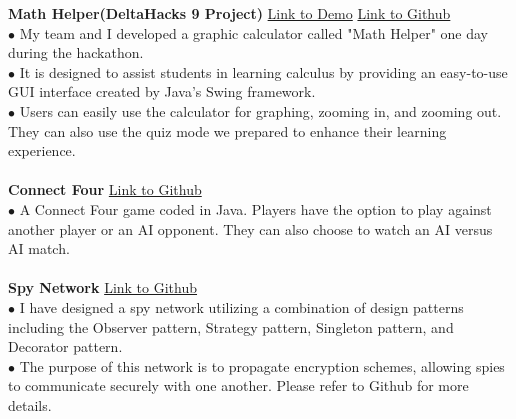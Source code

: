 \documentclass[letterpaper,12pt]{article}
\begin{document}
\textbf{Math Helper(DeltaHacks 9 Project)}  \hfill \href{https://devpost.com/software/math-helper-graphing-calculator}{Link to Demo} \hspace{0.2cm} \href{https://github.com/Zicheng-Li/Math_helper}{Link to Github} \\
\hspace{0.1cm} $\bullet$ My team and I developed a graphic calculator called "Math Helper" one day during the hackathon. \\
\hspace{0.1cm} $\bullet$ It is designed to assist students in learning calculus by providing an easy-to-use GUI interface created by Java's Swing framework.\\ 
\hspace{0.1cm} $\bullet$ Users can easily use the calculator for graphing, zooming in, and zooming out. They can also use the quiz mode we prepared to enhance their learning experience.  \\\\
\textbf{Connect Four}  \hfill \href{https://github.com/Zicheng-Li/Connect_Four}{Link to Github} \\
\hspace{0.1cm} $\bullet$ A Connect Four game coded in Java. Players have the option to play against another player or an AI opponent. They can also choose to watch an AI versus AI match. \\\\
\textbf{Spy Network}  \hfill \href{https://github.com/Zicheng-Li/Spy_Network_Framework}{Link to Github} \\
\hspace{0.1cm} $\bullet$ I have designed a spy network utilizing a combination of design patterns including the Observer pattern, Strategy pattern, Singleton pattern, and Decorator pattern.\\
\hspace{0.1cm} $\bullet$ The purpose of this network is to propagate encryption schemes, allowing spies to communicate securely with one another. Please refer to Github for more details.
\end{document}
